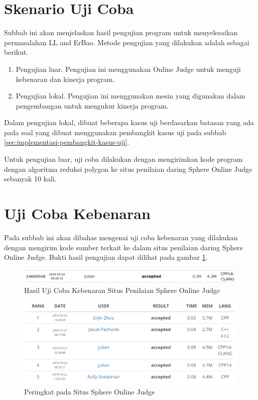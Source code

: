 \section{ Skenario Uji Coba}
\label{sec:skenario-uji-coba}
Subbab ini akan menjelaskan hasil pengujian program untuk menyelesaikan permasalahan LL and ErBao. Metode pengujian yang dilakukan adalah sebagai berikut.
\begin{enumerate}
	\item Pengujian luar. Pengujian ini menggunakan Online Judge untuk menguji kebenaran dan kinerja program.
	\item Pengujian lokal. Pengujian ini menggunakan mesin yang digunakan dalam pengembangan untuk mengukur kinerja program.
\end{enumerate}
Dalam pengujian lokal, dibuat beberapa kasus uji berdasarkan batasan yang ada pada soal yang dibuat menggunakan pembangkit kasus uji pada subbab \ref{sec:implementasi-pembangkit-kasus-uji}.
\par Untuk pengujian luar, uji coba dilakukan dengan mengirimkan kode program dengan algoritma reduksi polygon ke situs penilaian daring Sphere Online Judge sebanyak 10 kali.

\section{ Uji Coba Kebenaran}
Pada subbab ini akan dibahas mengenai uji coba kebenaran yang dilakukan dengan mengirim kode sumber terkait ke dalam situs penilaian daring Sphere Online Judge. Bukti hasil pengujian dapat dilihat pada gambar \ref{fig:hasil-uji-coba-kebenaran-situs-penilaian-spoj}.
\begin{figure}[!h]
	\Centering
	\includegraphics [width=\columnwidth]{bab5/img/hasil-uji-coba-kebenaran-situs-penilaian-spoj}
	\caption {Hasil Uji Coba Kebenaran Situs Penilaian Sphere Online Judge}
	\label {fig:hasil-uji-coba-kebenaran-situs-penilaian-spoj}
\end{figure}
\begin{figure}[!h]
	\Centering
	\includegraphics [width=\columnwidth]{bab5/img/rank}
	\caption {Peringkat pada Situs Sphere Online Judge}
	\label {fig:peringkat-situs-spoj}
\end{figure}

